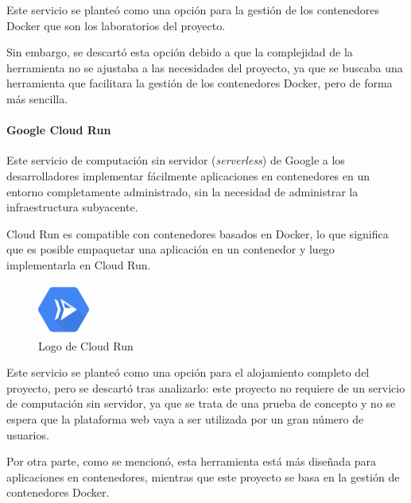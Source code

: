                     Este servicio se planteó como una opción para la gestión de los contenedores Docker que son los laboratorios del proyecto.

                    Sin embargo, se descartó esta opción debido a que la complejidad de la herramienta no se ajustaba a las necesidades del proyecto, ya que se buscaba una herramienta que facilitara la gestión de los contenedores Docker, pero de forma más sencilla.

                \paragraph{Google Cloud Run}

                    Este servicio de computación sin servidor (\textit{serverless}) de Google a los desarrolladores implementar fácilmente aplicaciones en contenedores en un entorno completamente administrado, sin la necesidad de administrar la infraestructura subyacente.
                    
                    Cloud Run es compatible con contenedores basados en Docker, lo que significa que es posible empaquetar una aplicación en un contenedor y luego implementarla en Cloud Run.

                    \begin{figure}[htbp]
                        \centering

                        \includegraphics[width=0.15\textwidth]{images/Logos/gcr.png}
                        \caption{Logo de Cloud Run}
                        
                        \label{fig:gcr-logo}
                    \end{figure}

                    Este servicio se planteó como una opción para el alojamiento completo del proyecto, pero se descartó tras analizarlo: este proyecto no requiere de un servicio de computación sin servidor, ya que se trata de una prueba de concepto y no se espera que la plataforma web vaya a ser utilizada por un gran número de usuarios.

                    Por otra parte, como se mencionó, esta herramienta está más diseñada para aplicaciones en contenedores, mientras que este proyecto se basa en la gestión de contenedores Docker.

